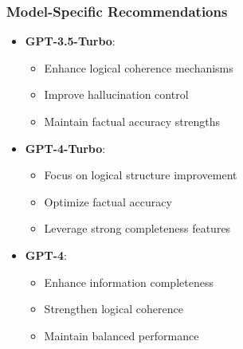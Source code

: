 \subsubsection{Model-Specific Recommendations}
\begin{itemize}
    \item \textbf{GPT-3.5-Turbo}:
    \begin{itemize}
        \item Enhance logical coherence mechanisms
        \item Improve hallucination control
        \item Maintain factual accuracy strengths
    \end{itemize}
    \item \textbf{GPT-4-Turbo}:
    \begin{itemize}
        \item Focus on logical structure improvement
        \item Optimize factual accuracy
        \item Leverage strong completeness features
    \end{itemize}
    \item \textbf{GPT-4}:
    \begin{itemize}
        \item Enhance information completeness
        \item Strengthen logical coherence
        \item Maintain balanced performance
    \end{itemize}
\end{itemize}

